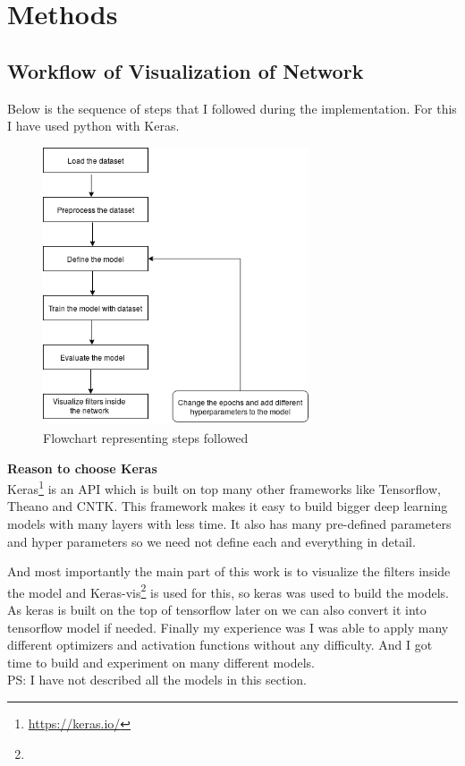\chapter{Methods}\label{chap:methods}
\section{Workflow of Visualization of Network}
Below is the sequence of steps that I followed during the implementation. For this I have used python with Keras. 
\begin{figure}[h]
    \centering
    \includegraphics[width=0.7\textwidth]{thesis_template/images/flo.png}
    \caption{\small Flowchart representing steps followed}
    \label{}
    \end{figure}


\newpage \noindent \textbf{Reason to choose Keras}\\
 Keras\footnote{\url{https://keras.io/}} is an API which is built on top many other frameworks like Tensorflow, Theano and CNTK. This framework makes it easy to build bigger deep learning models with many layers with less time. It also has many pre-defined parameters and hyper parameters so we need not define each and everything in detail. 

And most importantly the main part of this work is to visualize the filters inside the model and Keras-vis\footnote{} is used for this, so keras was used to build the models. As keras is built on the top of tensorflow later on we can also convert it into tensorflow model if needed. Finally my experience was I was able to apply many different optimizers and activation functions without any difficulty. And I got time to build and experiment on many different models.\\
PS: I have not described all the models in this section.

